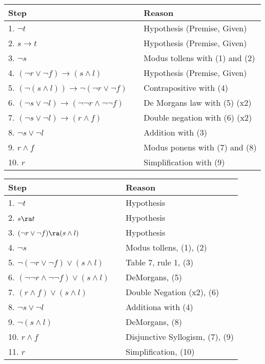 \begin{questions}
\begin{solution}
    \begin{tabular}{lll}
        Step    & \hspace{0.2in} & Reason \\
        \hline
        1. $\neg t$                 &       & Hypothesis (Premise, Given) \\
        2. $s \rightarrow t$        &       & Hypothesis (Premise, Given) \\
        3. $\neg s$                 &       & Modus tollens with (1) and (2) \\
        4. $(\neg r \vee \neg f) \rightarrow (s \wedge l)$  &   & Hypothesis (Premise, Given)  \\
        5. $(\neg(s \wedge l)) \rightarrow \neg(\neg r \vee \neg f)$    & & Contrapositive with (4) \\
        6. $(\neg s \vee \neg l) \rightarrow (\neg \neg r \wedge \neg \neg f)$ & & De Morgans law with (5) (x2) \\
        7. $(\neg s \vee \neg l) \rightarrow (r \wedge f)$  & & Double negation with (6) (x2) \\
        8. $\neg s \vee \neg l$     &       & Addition with (3) \\
        9. $r \wedge f$             &       & Modus ponens with (7) and (8) \\
        10. $r$                     &       & Simplification with (9)
    \end{tabular}

    \begin{tabular}{lll}
        Step   & \hspace{0.2in}     & Reason \\
        \hline
        1. $\neg t$                 &   & Hypothesis \\
        2. $s \ra t$                &   & Hypothesis \\
        3. $(\neg r \vee \neg f) \ra (s \wedge l)$  &   & Hypothesis \\
        4. $\neg s$                 &   & Modus tollens, (1), (2) \\
        5. $\neg (\neg r \vee \neg f) \vee (s \wedge l) $  & & Table 7, rule 1, (3) \\
        6. $(\neg \neg r \wedge \neg \neg f) \vee (s \wedge l)$  & & DeMorgans,  (5) \\
        7. $(r \wedge f) \vee (s \wedge l)$     & & Double Negation (x2), (6) \\
        8. $\neg s \vee \neg l$     &   & Additiona with (4) \\
        9. $\neg (s \wedge l)$      &   & DeMorgans, (8) \\
        10. $r \wedge f$            &   & Disjunctive Syllogism, (7), (9) \\
        11. $r$                     &   & Simplification, (10)
    \end{tabular}
\end{solution}




\end{questions}
